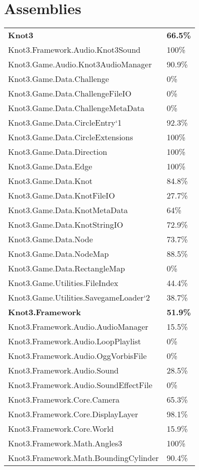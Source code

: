 \documentclass[a4paper,10pt]{article}
\begin{document}
\section{Assemblies}
\begin{longtable}[l]{ll}
\textbf{Knot3} & \textbf{66.5\%}\\
Knot3.Framework.Audio.Knot3Sound & 100\%\\
Knot3.Game.Audio.Knot3AudioManager & 90.9\%\\
Knot3.Game.Data.Challenge & 0\%\\
Knot3.Game.Data.ChallengeFileIO & 0\%\\
Knot3.Game.Data.ChallengeMetaData & 0\%\\
Knot3.Game.Data.CircleEntry`1 & 92.3\%\\
Knot3.Game.Data.CircleExtensions & 100\%\\
Knot3.Game.Data.Direction & 100\%\\
Knot3.Game.Data.Edge & 100\%\\
Knot3.Game.Data.Knot & 84.8\%\\
Knot3.Game.Data.KnotFileIO & 27.7\%\\
Knot3.Game.Data.KnotMetaData & 64\%\\
Knot3.Game.Data.KnotStringIO & 72.9\%\\
Knot3.Game.Data.Node & 73.7\%\\
Knot3.Game.Data.NodeMap & 88.5\%\\
Knot3.Game.Data.RectangleMap & 0\%\\
Knot3.Game.Utilities.FileIndex & 44.4\%\\
Knot3.Game.Utilities.SavegameLoader`2 & 38.7\%\\
\textbf{Knot3.Framework} & \textbf{51.9\%}\\
Knot3.Framework.Audio.AudioManager & 15.5\%\\
Knot3.Framework.Audio.LoopPlaylist & 0\%\\
Knot3.Framework.Audio.OggVorbisFile & 0\%\\
Knot3.Framework.Audio.Sound & 28.5\%\\
Knot3.Framework.Audio.SoundEffectFile & 0\%\\
Knot3.Framework.Core.Camera & 65.3\%\\
Knot3.Framework.Core.DisplayLayer & 98.1\%\\
Knot3.Framework.Core.World & 15.9\%\\
Knot3.Framework.Math.Angles3 & 100\%\\
Knot3.Framework.Math.BoundingCylinder & 90.4\%\\

\end{longtable}
\end{document}
